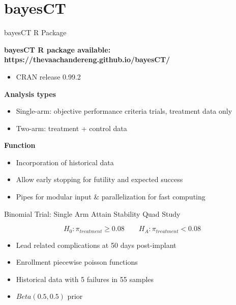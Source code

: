 \documentclass[12pt,t]{beamer}
\begin{document}
\section{bayesCT}

\begin{frame}{bayesCT R Package}

\textbf{bayesCT R package available: https://thevaachandereng.github.io/bayesCT/} \\
\begin{itemize}
\item CRAN release 0.99.2 \\
\end{itemize}

\textbf{Analysis types} \\
\begin{itemize}
\item  Single-arm: objective performance criteria trials, treatment data only 
\item Two-arm: treatment + control data 
\end{itemize}

\textbf{Function} \\
\begin{itemize}
\item Incorporation of historical data \\
\item Allow early stopping for futility and expected success \\
\item Pipes for modular input \& parallelization for fast computing \\
\end{itemize}

\end{frame}





\begin{frame}{Binomial Trial: Single Arm}
Attain Stability Quad Study

$$H_0: \pi_{treatment} \geq 0.08 \qquad H_A:\pi_{treatment} < 0.08$$
\begin{itemize}
\item Lead related complications at 50 days post-implant
\item Enrollment piecewise poisson functions
\item Historical data with 5 failures in 55 samples
\item $Beta(0.5, 0.5)$ prior
\end{itemize}


\end{frame}
\end{document}
